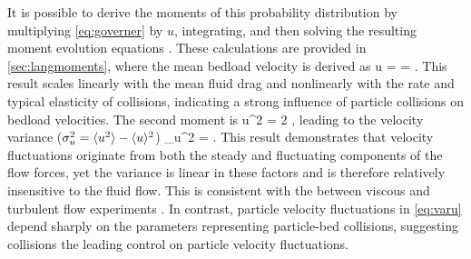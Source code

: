 It is possible to derive the moments of this probability distribution by multiplying \DIFaddbegin {}\DIFaddend \ref{eq:governer} by $u$, integrating, and then solving the resulting moment evolution equations \DIFdelbegin {}\DIFdelend \DIFaddbegin {}\DIFaddend .
These calculations are provided in \DIFdelbegin {}\DIFdelend \DIFaddbegin {}\DIFaddend \ref{sec:langmoments}, where the mean bedload velocity is derived as
\be \langle u \rangle =  = \DIFdelbegin {}\DIFdelend \DIFaddbegin {}\DIFaddend . \label{eq:meanu}\ee
This result scales linearly with the mean fluid drag and nonlinearly with the rate and typical elasticity of collisions, indicating a strong influence of particle collisions on bedload velocities.
The second moment is
\be \langle u^2 \rangle = 2 \DIFdelbegin {}\DIFdelend \DIFaddbegin {}\DIFaddend , \ee
leading to the velocity variance ($\sigma_u^2 = \langle u^2 \rangle - \langle u \rangle ^2 $)
\be \sigma_u^2 = \DIFdelbegin {}\DIFdelend \DIFaddbegin {}\DIFaddend . \label{eq:varu}\ee
This result demonstrates that \DIFaddbegin {}\DIFaddend velocity fluctuations originate from both the steady and fluctuating components of the flow forces, yet the variance is linear in these factors and is therefore relatively insensitive to the fluid flow.
This is consistent with the \DIFdelbegin {}\DIFdelend \DIFaddbegin {}\DIFaddend between viscous and turbulent flow experiments \citep[e.g.][]{Charru2004,Lajeunesse2010}.
In contrast, particle velocity fluctuations in \DIFdelbegin {}\DIFdelend \DIFaddbegin {}\DIFaddend \ref{eq:varu} depend sharply on the parameters representing particle-bed collisions, suggesting collisions \DIFdelbegin {}\DIFdelend \DIFaddbegin {}\DIFaddend the leading control on particle velocity fluctuations.

